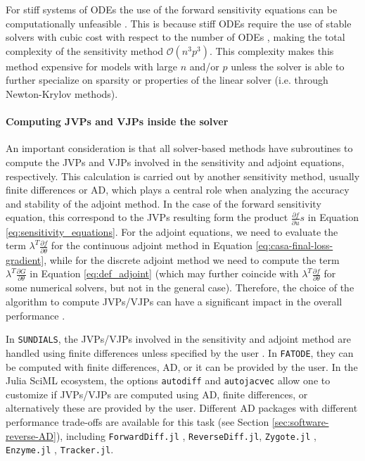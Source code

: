 For stiff systems of ODEs the use of the forward sensitivity equations can be computationally unfeasible \cite{kim_stiff_2021}.
This is because stiff ODEs require the use of stable solvers with cubic cost with respect to the number of ODEs \cite{hairer-solving-2}, making the total complexity of the sensitivity method $\mathcal{O}(n^3p^3)$. 
This complexity makes this method expensive for models with large $n$ and/or $p$ unless the solver is able to further specialize on sparsity or properties of the linear solver (i.e. through Newton-Krylov methods). 

\paragraph{Computing JVPs and VJPs inside the solver}
\label{section:computing-vjp-inside-solver}

An important consideration is that all solver-based methods have subroutines to compute the JVPs and VJPs involved in the sensitivity and adjoint equations, respectively. 
This calculation is carried out by another sensitivity method, usually finite differences or AD, which plays a central role when analyzing the accuracy and stability of the adjoint method. 
In the case of the forward sensitivity equation, this correspond to the JVPs resulting form the product $\frac{\partial f}{\partial u} s $ in Equation \eqref{eq:sensitivity_equations}.
For the adjoint equations, we need to evaluate the term $\lambda^T \frac{\partial f}{\partial \theta}$ for the continuous adjoint method in Equation \eqref{eq:casa-final-loss-gradient}, while for the discrete adjoint method we need to compute the term $\lambda^T \frac{\partial G}{\partial \theta}$ in Equation \eqref{eq:def_adjoint} (which may further coincide with $\lambda^T \frac{\partial f}{\partial \theta}$ for some numerical solvers, but not in the general case). 
Therefore, the choice of the algorithm to compute JVPs/VJPs can have a significant impact in the overall performance \cite{Schäfer_Tarek_White_Rackauckas_2021}. 

In \texttt{SUNDIALS}, the JVPs/VJPs involved in the sensitivity and adjoint method are handled using finite differences unless specified by the user \cite{SUNDIALS-hindmarsh2005sundials}.
In \texttt{FATODE}, they can be computed with finite differences, AD, or it can be provided by the user.
In the Julia SciML ecosystem, the options \texttt{autodiff} and \texttt{autojacvec} allow one to customize if JVPs/VJPs are computed using AD, finite differences, or alternatively these are provided by the user. 
Different AD packages with different performance trade-offs are available for this task (see Section \ref{sec:software-reverse-AD}), including \texttt{ForwardDiff.jl} \cite{RevelsLubinPapamarkou2016}, \texttt{ReverseDiff.jl}, \texttt{Zygote.jl} \cite{Innes_Zygote}, \texttt{Enzyme.jl} \cite{moses_Enzyme}, \texttt{Tracker.jl}.


